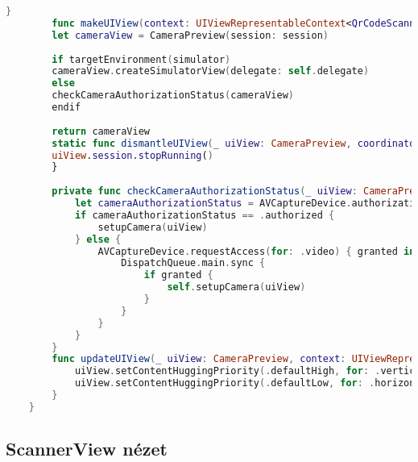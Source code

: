 \hspace{-10mm}
\begin{minipage}{\textwidth}
    \linespread{0.8}\selectfont
    \begin{lstlisting}[language=swift]
    }
        func makeUIView(context: UIViewRepresentableContext<QrCodeScannerView>) = QrCodeScannerView.UIViewType {
        let cameraView = CameraPreview(session: session)
        
        if targetEnvironment(simulator)
        cameraView.createSimulatorView(delegate: self.delegate)
        else
        checkCameraAuthorizationStatus(cameraView)
        endif
        
        return cameraView
        static func dismantleUIView(_ uiView: CameraPreview, coordinator: ()) {
        uiView.session.stopRunning()
        }
    
        private func checkCameraAuthorizationStatus(_ uiView: CameraPreview) {
            let cameraAuthorizationStatus = AVCaptureDevice.authorizationStatus(for: .video)
            if cameraAuthorizationStatus == .authorized {
                setupCamera(uiView)
            } else {
                AVCaptureDevice.requestAccess(for: .video) { granted in
                    DispatchQueue.main.sync {
                        if granted {
                            self.setupCamera(uiView)
                        }
                    }
                }
            }
        }
        func updateUIView(_ uiView: CameraPreview, context: UIViewRepresentableContext<QrCodeScannerView>) {
            uiView.setContentHuggingPriority(.defaultHigh, for: .vertical)
            uiView.setContentHuggingPriority(.defaultLow, for: .horizontal)
        }
    }
    \end{lstlisting}   
\end{minipage}

\subsection*{ScannerView nézet}

